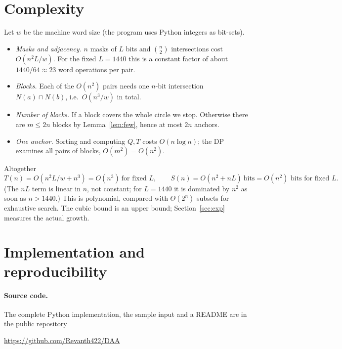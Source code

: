 \documentclass[11pt,a4paper]{article}
\theoremstyle{definition}
\theoremstyle{remark}
\newcommand{\Qf}{Q}
\newcommand{\Tf}{T}
\begin{document}
\section{Complexity}\label{sec:complexity}
Let $w$ be the machine word size (the program uses Python integers as bit-sets).
\begin{itemize}[nosep]
 \item \emph{Masks and adjacency.} $n$ masks of $L$ bits and $\binom n2$ intersections
   cost $O(n^2L/w)$.  For the fixed $L=1440$ this is a constant factor of about
   $1440/64\approx23$ word operations per pair.
 \item \emph{Blocks.} Each of the $O(n^2)$ pairs needs one $n$-bit intersection
   $N(a)\cap N(b)$, i.e.\ $O(n^3/w)$ in total.
 \item \emph{Number of blocks.} If a block covers the whole circle we stop.  Otherwise there
   are $m\le2n$ blocks by Lemma~\ref{lem:few}, hence at most $2n$ anchors.
 \item \emph{One anchor.} Sorting and computing $\Qf,\Tf$ costs $O(n\log n)$; the DP
   examines all pairs of blocks, $O(m^2)=O(n^2)$.
\end{itemize}
Altogether
\[
 T(n)=O\!\left(n^2L/w+n^3\right)=O(n^3)\ \text{for fixed }L,\qquad
 S(n)=O(n^2+nL)\ \text{bits}=O(n^2)\text{ bits for fixed }L.
\]
(The $nL$ term is linear in $n$, not constant; for $L=1440$ it is dominated by $n^2$ as soon
as $n>1440$.)  This is polynomial, compared with $\Theta(2^n)$ subsets for exhaustive
search.  The cubic bound is an upper bound; Section~\ref{sec:exp} measures the actual
growth.

\section{Implementation and reproducibility}\label{sec:impl}
\paragraph{Source code.} The complete Python implementation, the sample input and a
README are in the public repository

\begin{center}\url{https://github.com/Revanth422/DAA}\end{center}
\end{document}
